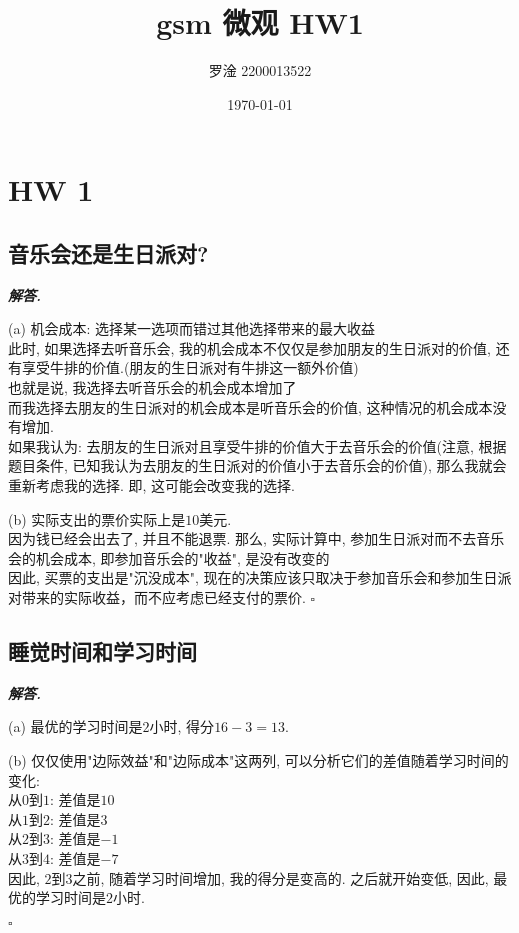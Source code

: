 \documentclass[10pt, a4paper, oneside]{ctexart}
\title{\textbf{gsm 微观 HW1}}
\author{罗淦  2200013522}
\date{\today}
\newenvironment{solution}{%
  \par\noindent\textbf{\textit{解答. }}\ignorespaces
}{%
  \hfill\ensuremath{\square}\par %
}
\begin{document}
\maketitle

\section{HW 1}

\subsection{音乐会还是生日派对?}

\begin{solution}
(a) 机会成本: 选择某一选项而错过其他选择带来的最大收益\\
此时, 如果选择去听音乐会, 我的机会成本不仅仅是参加朋友的生日派对的价值, 还有享受牛排的价值.(朋友的生日派对有牛排这一额外价值)\\
也就是说, 我选择去听音乐会的机会成本增加了\\
而我选择去朋友的生日派对的机会成本是听音乐会的价值, 这种情况的机会成本没有增加.\\
如果我认为: 去朋友的生日派对且享受牛排的价值大于去音乐会的价值(注意, 根据题目条件, 已知我认为去朋友的生日派对的价值小于去音乐会的价值), 那么我就会重新考虑我的选择. 即, 这可能会改变我的选择.

(b) 实际支出的票价实际上是$10$美元.\\
因为钱已经会出去了, 并且不能退票. 那么, 实际计算中, 参加生日派对而不去音乐会的机会成本, 即参加音乐会的"收益", 是没有改变的\\
因此, 买票的支出是"沉没成本", 现在的决策应该只取决于参加音乐会和参加生日派对带来的实际收益，而不应考虑已经支付的票价.
\end{solution}

\subsection{睡觉时间和学习时间}

\begin{solution}
(a) 最优的学习时间是$2$小时, 得分$16-3=13$.

(b) 仅仅使用"边际效益"和"边际成本"这两列, 可以分析它们的差值随着学习时间的变化:\\
从$0$到$1$: 差值是$10$\\
从$1$到$2$: 差值是$3$\\
从$2$到$3$: 差值是$-1$\\
从$3$到$4$: 差值是$-7$\\
因此, $2$到$3$之前, 随着学习时间增加, 我的得分是变高的. 之后就开始变低, 因此, 最优的学习时间是$2$小时.

\end{solution}
\newpage
\end{document}
